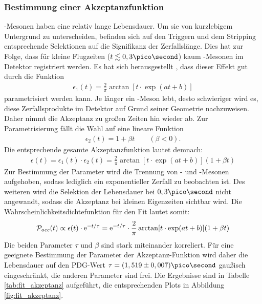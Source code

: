 \subsubsection{Bestimmung einer Akzeptanzfunktion} 
\Bd-Mesonen haben eine relativ lange Lebensdauer. Um sie von kurzlebigem Untergrund zu unterscheiden, befinden sich auf den Triggern und dem Stripping entsprechende Selektionen auf die Signifikanz der Zerfallslänge. Dies hat zur Folge, dass für kleine Flugzeiten ($t \lesssim 0,3\pico\second$) kaum \Bd-Mesonen im Detektor registriert werden. Es hat sich herausgestellt \cite{lhcb-paper}, dass dieser Effekt gut durch die Funktion
\begin{align}
\epsilon_1(t) = \frac{2}{\pi}\arctan[t\cdot \exp(at+b)]
\end{align}
parametrisiert werden kann. Je länger ein \Bd-Meson lebt, desto schwieriger wird es, diese Zerfallsprodukte im Detektor auf Grund seiner Geometrie nachzuweisen. Daher nimmt die Akzeptanz zu großen Zeiten hin wieder ab. Zur Parametrisierung fällt die Wahl auf eine lineare Funktion
\begin{align}
\epsilon_2(t) = 1 + \beta t \qquad (\beta < 0).
\end{align}
Die entsprechende gesamte Akzeptanzfunktion lautet demnach:
\begin{align}
\epsilon(t) = \epsilon_1(t) \cdot \epsilon_2(t) = \frac{2}{\pi}\arctan[t\cdot \exp(at+b)](1 + \beta t)
\end{align}
Zur Bestimmung der Parameter wird die Trennung von \Bd- und \Bdbar-Mesonen aufgehoben, sodass lediglich ein exponentieller Zerfall zu beobachten ist. Des weiteren wird die Selektion der Lebensdauer bei $0,3\pico\second$ nicht angewandt, sodass die Akzeptanz bei kleinen Eigenzeiten sichtbar wird. Die Wahrscheinlichkeitsdichtefunktion für den Fit lautet somit:
\begin{align}
\mathcal{P}_{acc}(t) \propto \epsilon(t)\cdot \mathrm{e}^{-t/\tau} = \mathrm{e}^{-t/\tau}\cdot\frac{2}{\pi}\arctan[t\cdot \exp(at+b)](1 + \beta t)
\end{align}
Die beiden Parameter $\tau$ und $\beta$ sind stark miteinander korreliert. Für eine geeignete Bestimmung der Parameter der Akzeptanz-Funktion wird daher die Lebensdauer auf den PDG-Wert $\tau = (1,519 \pm 0,007)\pico\second$ \cite{pdg-tau} gaußisch eingeschränkt, die anderen Parameter sind frei. Die Ergebnisse sind in Tabelle \ref{tab:fit_akzeptanz} aufgeführt, die entsprechenden Plots in Abbildung \ref{fig:fit_akzeptanz}. 
